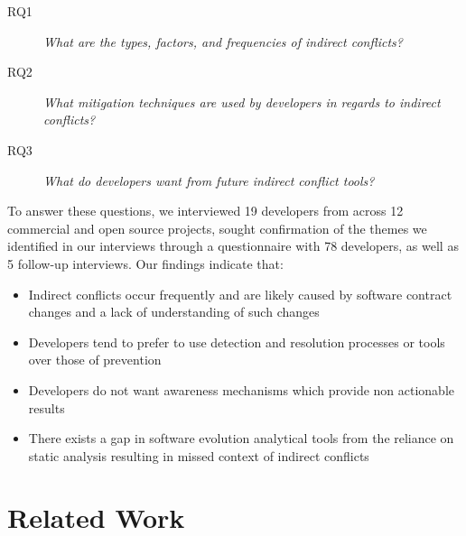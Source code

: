 \documentclass[conference]{IEEEtran}
\makeatletter
\def\namedlabel#1#2{\begingroup
   \def\@currentlabel{#2}%
   \label{#1}\endgroup
}
\makeatother
\begin{document}
\begin{description}
	\item[RQ1\namedlabel{itm:rq1}{RQ1}] \textit{What are the types, factors, and frequencies of indirect conflicts?}
	\item[RQ2\namedlabel{itm:rq2}{RQ2}] \textit{What mitigation techniques are used by developers in regards to indirect conflicts?}
	\item[RQ3\namedlabel{itm:rq3}{RQ3}] \textit{What do developers want from future indirect conflict tools?}
\end{description}

To answer these questions, we interviewed 19 developers from across 12 commercial and open source projects, sought confirmation of the themes we identified in our interviews through a questionnaire with 78
developers, as well as 5 follow-up interviews. Our findings indicate that:
\begin{itemize}
	\item Indirect conflicts occur frequently and are likely caused by software contract changes and a lack of understanding of such changes
	\item Developers tend to prefer to use detection and resolution processes or tools over those of prevention
	\item Developers do not want awareness mechanisms which provide non actionable results
	\item There exists a gap in software evolution analytical tools from the reliance on static analysis resulting in missed
				context of indirect conflicts
\end{itemize}

\section{Related Work}
\label{sec:related}
\end{document}
